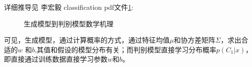 详细推导见 李宏毅 classification pdf文件\ref{fig:math_of_generation model}:
\begin{figure}
\centering

{\quad
{}
}
\caption{生成模型到判别模型数学机理}
\label{fig:math_of_generation model}
\end{figure}

可见，生成模型，通过计算概率的方式，通过特征均值$\mu$和协方差矩阵$\Sigma$，求出合适的$w$ 和$b$,其值和假设的模型分布有关；而判别模型直接学习分布概率$p(C_1|x)$，即直接通过训练数据直接学习参数$w$和$b$。

